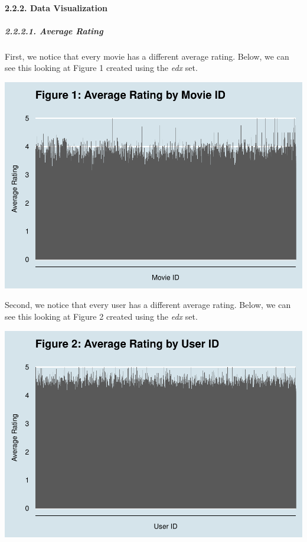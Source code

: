 \documentclass[
]{article}
\begin{document}
\hypertarget{data-visualization}{%
\paragraph{2.2.2. Data Visualization}\label{data-visualization}}

\hypertarget{average-rating}{%
\subparagraph{2.2.2.1. Average Rating}\label{average-rating}}

\hfill\break
First, we notice that every movie has a different average rating. Below,
we can see this looking at Figure 1 created using the \emph{edx} set.

\begin{center}\includegraphics[width=0.75\linewidth,height=0.5\textheight]{MovieLens_Project_files/figure-latex/Figure 1 - Average Rating by Movie ID-1} \end{center}

Second, we notice that every user has a different average rating. Below,
we can see this looking at Figure 2 created using the \emph{edx} set.

\begin{center}\includegraphics[width=0.75\linewidth,height=0.5\textheight]{MovieLens_Project_files/figure-latex/Figure 2 - Average Rating by User ID-1} \end{center}
\end{document}
